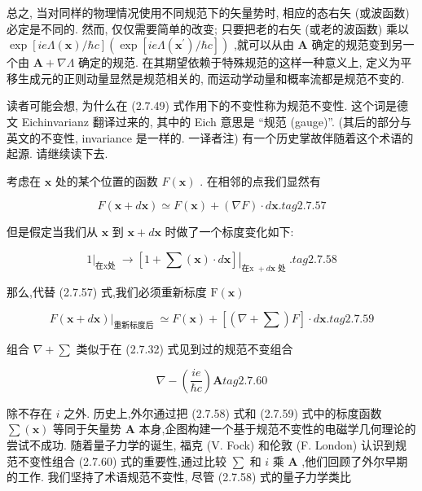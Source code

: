 \documentclass[lang=cn,newtx,10pt,scheme=chinese,thmcnt=section]{elegantbook}
\begin{document}
总之, 当对同样的物理情况使用不同规范下的矢量势时, 相应的态右矢 (或波函数) 必定是不同的. 然而, 仅仅需要简单的改变; 只要把老的右矢 (或老的波函数) 乘以 $\exp \left\lbrack {{ie\Lambda }\left( \mathbf{x}\right) /\hbar c}\right\rbrack \left( {\exp \left\lbrack {{ie\Lambda }\left( {\mathbf{x}}^{\prime }\right) /\hbar c}\right\rbrack }\right)$ ,就可以从由 $\mathbf{A}$ 确定的规范变到另一个由 $\mathbf{A} + \nabla \Lambda$ 确定的规范. 在其期望依赖于特殊规范的这样一种意义上, 定义为平移生成元的正则动量显然是规范相关的, 而运动学动量和概率流都是规范不变的.

读者可能会想, 为什么在 (2.7.49) 式作用下的不变性称为规范不变性. 这个词是德文 Eichinvarianz 翻译过来的, 其中的 Eich 意思是 “规范 (gauge)”. (其后的部分与英文的不变性, invariance 是一样的. 一译者注) 有一个历史掌故伴随着这个术语的起源. 请继续读下去.

考虑在 $\mathbf{x}$ 处的某个位置的函数 $F\left( \mathbf{x}\right)$ . 在相邻的点我们显然有

$$
F\left( {\mathbf{x} + d\mathbf{x}}\right) \simeq F\left( \mathbf{x}\right) + \left( {\nabla F}\right) \cdot d\mathbf{x}. tag{2. 7.57}
$$

但是假定当我们从 $\mathbf{x}$ 到 $\mathbf{x} + d\mathbf{x}$ 时做了一个标度变化如下:

$$
{\left. 1\right| }_{\text{在x处 }} \rightarrow {\left. \left\lbrack 1 + \sum \left( \mathbf{x}\right) \cdot d\mathbf{x}\right\rbrack \right| }_{\text{在x } + d\mathbf{x}\text{ 处 }}. tag{2. 7.58}
$$

那么,代替 (2.7.57) 式,我们必须重新标度 $\mathrm{F}\left( \mathbf{x}\right)$

$$
{\left. F\left( \mathbf{x} + d\mathbf{x}\right) \right| }_{\text{重新标度后 }} \simeq F\left( \mathbf{x}\right) + \left\lbrack {\left( {\nabla + \mathbf{\sum }}\right) F}\right\rbrack \cdot d\mathbf{x}. tag{2. 7.59}
$$

组合 $\nabla + \mathbf{\sum }$ 类似于在 (2.7.32) 式见到过的规范不变组合

$$
\nabla - \left( \frac{ie}{\hbar c}\right) \mathbf{A} tag{2. 7.60}
$$

除不存在 $i$ 之外. 历史上,外尔通过把 (2.7.58) 式和 (2.7.59) 式中的标度函数 $\mathbf{\sum }\left( \mathbf{x}\right)$ 等同于矢量势 $\mathbf{A}$ 本身,企图构建一个基于规范不变性的电磁学几何理论的尝试不成功. 随着量子力学的诞生, 福克 (V. Fock) 和伦敦 (F. London) 认识到规范不变性组合 (2.7.60) 式的重要性,通过比较 $\mathbf{\sum }$ 和 $i$ 乘 $\mathbf{A}$ ,他们回顾了外尔早期的工作. 我们坚持了术语规范不变性, 尽管 (2.7.58) 式的量子力学类比
\end{document}
